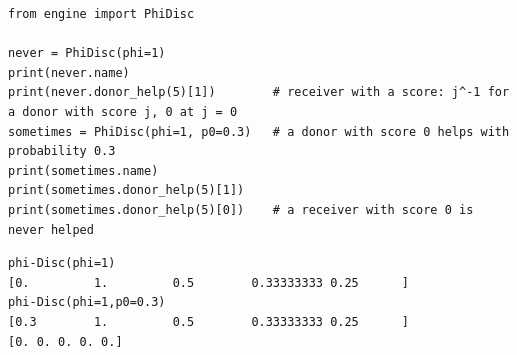 \begin{lstlisting}[style=code]
from engine import PhiDisc

never = PhiDisc(phi=1)
print(never.name)
print(never.donor_help(5)[1])        # receiver with a score: j^-1 for a donor with score j, 0 at j = 0
sometimes = PhiDisc(phi=1, p0=0.3)   # a donor with score 0 helps with probability 0.3
print(sometimes.name)
print(sometimes.donor_help(5)[1])
print(sometimes.donor_help(5)[0])    # a receiver with score 0 is never helped
\end{lstlisting}
\begin{lstlisting}[style=output]
phi-Disc(phi=1)
[0.         1.         0.5        0.33333333 0.25      ]
phi-Disc(phi=1,p0=0.3)
[0.3        1.         0.5        0.33333333 0.25      ]
[0. 0. 0. 0. 0.]
\end{lstlisting}
